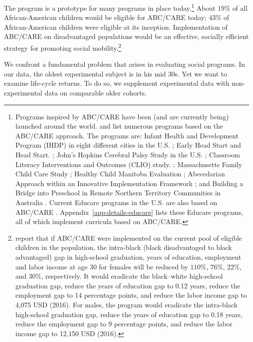 The program is a prototype for many programs in place today.\footnote{Programs inspired by ABC/CARE have been (and are currently being) launched around the world. \citet{Sparling_2010_Highlights} and \citet{Ramey_Ramey_Lanzi_2014_Interventions} list numerous programs based on the ABC/CARE approach. The programs are: Infant Health and Development Program (IHDP) in eight different cities in the U.S. \citep{Spiker-etal_1997_Helping}; Early Head Start and Head Start. \citep{Schneider_McDonald-eds_2007_Scale-Up_Vol-1}; John's Hopkins Cerebral Palsy Study in the U.S. \citep{Sparling_2010_Highlights}; Classroom Literacy Interventions and Outcomes (CLIO) study. \citep{Sparling_2010_Highlights}; Massachusetts Family Child Care Study \citep{Collins_etal_2010_Massachusetts-Study}; Healthy Child Manitoba Evaluation \citep{Healthy_Child_Manitoba_2015_Starting-Early}; Abecedarian Approach within an Innovative Implementation Framework \citep{Jensen_Nielsen_2016_ABC-Programme-Pilot}; and Building a Bridge into Preschool in Remote Northern Territory Communities in Australia \citep{UMonash_Dataset_2015_URL}. Current Educare programs in the U.S. are also based on ABC/CARE \citep{Educare_2014_Research_Agenda,Yazejian_Bryant_2012_Educare}. Appendix~\ref{app:details-educare} lists these Educare programs, all of which implement curricula based on ABC/CARE.} About 19\% of all African-American children would be eligible for ABC/CARE today; 43\% of African-American children were eligible at its inception. Implementation of ABC/CARE on disadvantaged populations would be an effective, socially efficient strategy for promoting social mobility.\footnote{\citet{Garcia_2016_National-Implementation-ECI} report that if ABC/CARE were implemented on the current pool of eligible children in the population, the intra-black (black disadvantaged to black advantaged) gap in high-school graduation, years of education, employment and labor income at age 30 for females will be reduced by $110\%$, $76\%$, $22\%$, and $30\%$, respectively. It would eradicate the black--white high-school graduation gap, reduce the years of education gap to 0.12 years, reduce the employment gap to 14 percentage points, and reduce the labor income gap to 4,075 USD (2016). For males, the program would eradicate the intra-black high-school graduation gap, reduce the years of education gap to 0.18 years, reduce the employment gap to 9 percentage points, and reduce the labor income gap to 12,150 USD (2016).}

We confront a fundamental problem that arises in evaluating social programs. In our data, the oldest experimental subject is in his mid 30s. Yet we want to examine life-cycle returns. To do so, we supplement experimental data with non-experimental data on comparable older cohorts.

